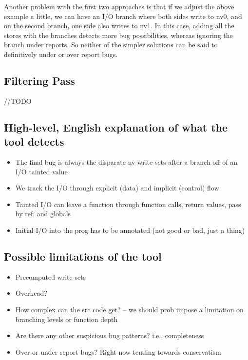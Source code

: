 Another problem with the first two approaches is that if we adjust the above example a little, we can have an I/O branch where both sides write to nv0, and on the second branch, one side also writes to nv1. In this case, adding all the stores with the branches detects more bug possibilities, whereas ignoring the branch under reports. So neither of the simpler solutions can be said to definitively under or over report bugs. 
	
\subsection{Filtering Pass}
//TODO

\subsection{High-level, English explanation of what the tool detects}
\begin{itemize}
\item{The final bug is always the disparate nv write sets after a branch off of an I/O tainted value}
\item{We track the I/O through explicit (data) and implicit (control) flow}
\item{Tainted I/O can leave a function through function calls, return values, pass by ref, and globals}
\item{Initial I/O into the prog has to be annotated (not good or bad, just a thing)}
\end{itemize}	
\subsection{Possible limitations of the tool}
\begin{itemize}
\item{Precomputed write sets}  
\item{Overhead?}
\item{How complex can the src code get? -- we should prob impose a limitation on branching levels or function depth}
\item{Are there any other suspicious bug patterns? i.e., completeness}
\item{Over or under report bugs? Right now tending towards conservatism}
\end{itemize}	